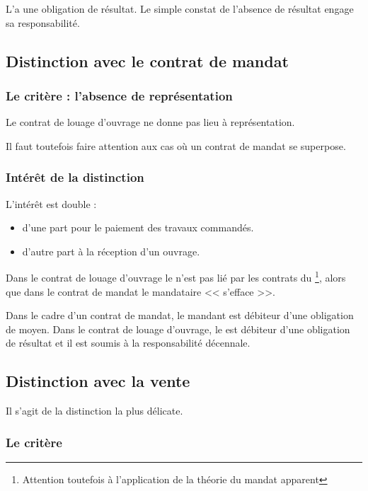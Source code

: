 				L'\E a une obligation de résultat. Le simple constat de l'absence de résultat engage sa responsabilité.
		
		\subsection{Distinction avec le contrat de mandat}
		
			\subsubsection{Le critère : l'absence de représentation}
			
				Le contrat de louage d'ouvrage ne donne pas lieu à représentation. 
				
				\begin{conseil}
					Il faut toutefois faire attention aux cas où un contrat de mandat se superpose.
				\end{conseil}
			
			\subsubsection{Intérêt de la distinction}
			
			L'intérêt est double :
			\begin{itemize}
				\item d'une part pour le paiement des travaux commandés.
				\item d'autre part à la réception d'un ouvrage.
			\end{itemize}
			
			Dans le contrat de louage d'ouvrage le \Mo{} n'est pas lié par les contrats du \lo{}\footnote{Attention toutefois à l'application de la théorie du mandat apparent}, alors que dans le contrat de mandat le mandataire << s'efface >>.
			
			Dans le cadre d'un contrat de mandat, le mandant est débiteur d'une obligation de moyen. Dans le contrat de louage d'ouvrage, le \lo{} est débiteur d'une obligation de résultat et il est soumis à la responsabilité décennale.
		
		\subsection{Distinction avec la vente}
		
			Il s'agit de la distinction la plus délicate.
		
			\subsubsection{Le critère}
			
